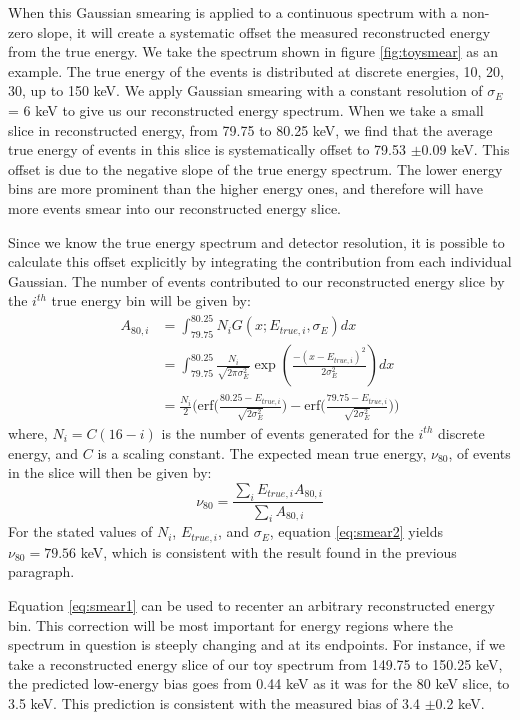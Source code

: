 When this Gaussian smearing is applied to a continuous spectrum with a non-zero slope, it will create a systematic offset the measured reconstructed energy from the true energy. We take the spectrum shown in figure \ref{fig:toysmear} as an example. The true energy of the events is distributed at discrete energies, 10, 20, 30, up to 150 keV. We apply Gaussian smearing with a constant resolution of $\sigma_{E}$= 6 keV to give us our reconstructed energy spectrum. When we take a small slice in reconstructed energy, from 79.75 to 80.25 keV, we find that the average true energy of events in this slice is systematically offset to 79.53 $\pm$0.09 keV. This offset is due to the negative slope of the true energy spectrum. The lower energy bins are more prominent than the higher energy ones, and therefore will have more events smear into our reconstructed energy slice.

Since we know the true energy spectrum and detector resolution, it is possible to calculate this offset explicitly by integrating the contribution from each individual Gaussian. The number of events contributed to our reconstructed energy slice by the $i^{th}$ true energy bin will be given by:
\begin{equation}\label{eq:smear1}
\begin{split}
A_{80,i}&=\int_{79.75}^{80.25}N_iG(x;E_{true,i},\sigma_E)dx\\
&=\int_{79.75}^{80.25}\frac{N_i}{\sqrt{2\pi \sigma_{E}^{2}}} \exp \left(\frac{-(x-E_{true,i})^2}{2\sigma_{E}^{2}}\right)dx\\
&=\frac{N_i}{2} \Bigg(\text{erf} \bigg(\frac{80.25-E_{true,i}}{\sqrt{2\sigma_E^2}}\bigg)-\text{erf} \bigg(\frac{79.75-E_{true,i}}{\sqrt{2\sigma_E^2}}\bigg)\Bigg)
\end{split}
\end{equation}
where, $N_i=C(16-i)$ is the number of events generated for  the $i^{th}$ discrete energy, and $C$ is a scaling constant. The expected mean true energy, $\nu_{80}$, of events in the slice will then be given by:
\begin{equation}\label{eq:smear2}
\nu_{80}=\frac{\sum_i E_{true,i}A_{80,i}}{\sum_i A_{80,i}}
\end{equation}
For the stated values of $N_i$, $E_{true,i}$, and $\sigma_E$, equation \ref{eq:smear2} yields $\nu_{80}=79.56$ keV, which is consistent with the result found in the previous paragraph.  

Equation \ref{eq:smear1} can be used to recenter an arbitrary reconstructed energy bin. This correction will be most important for energy regions where the spectrum in question is steeply changing and at its endpoints. For instance, if we take a reconstructed energy slice of our toy spectrum from 149.75 to 150.25 keV, the predicted low-energy bias goes from 0.44 keV as it was for the 80 keV slice, to 3.5 keV. This prediction is consistent with the measured bias of 3.4 $\pm$0.2 keV.

